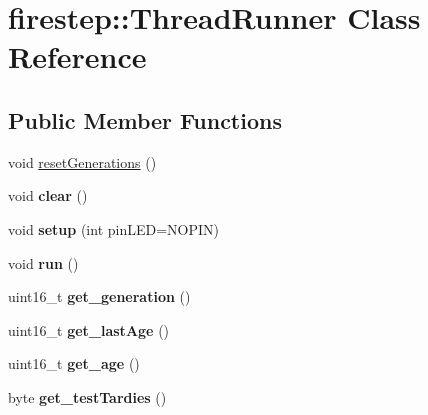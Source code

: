\hypertarget{classfirestep_1_1_thread_runner}{\section{firestep\+:\+:Thread\+Runner Class Reference}
\label{classfirestep_1_1_thread_runner}
}
\subsection*{Public Member Functions}
\begin{DoxyCompactItemize}
\item 
void \hyperlink{classfirestep_1_1_thread_runner_a5d0618373b9fb949f04ae923af314842}{reset\+Generations} ()
\item 
\hypertarget{classfirestep_1_1_thread_runner_a98c086925b952cff676e6709410ab7c5}{void {\bfseries clear} ()}\label{classfirestep_1_1_thread_runner_a98c086925b952cff676e6709410ab7c5}

\item 
\hypertarget{classfirestep_1_1_thread_runner_a510ecff046fe75f5e59a8785e627fc78}{void {\bfseries setup} (int pin\+L\+E\+D=N\+O\+P\+I\+N)}\label{classfirestep_1_1_thread_runner_a510ecff046fe75f5e59a8785e627fc78}

\item 
\hypertarget{classfirestep_1_1_thread_runner_a8a04d5dcf14c421898c15d4131dfd76c}{void {\bfseries run} ()}\label{classfirestep_1_1_thread_runner_a8a04d5dcf14c421898c15d4131dfd76c}

\item 
\hypertarget{classfirestep_1_1_thread_runner_ae4da2c930a006078a3450015083c937f}{uint16\+\_\+t {\bfseries get\+\_\+generation} ()}\label{classfirestep_1_1_thread_runner_ae4da2c930a006078a3450015083c937f}

\item 
\hypertarget{classfirestep_1_1_thread_runner_a94b41f44713663aec974d2e0265bf37f}{uint16\+\_\+t {\bfseries get\+\_\+last\+Age} ()}\label{classfirestep_1_1_thread_runner_a94b41f44713663aec974d2e0265bf37f}

\item 
\hypertarget{classfirestep_1_1_thread_runner_af6d87e51d9bb2e8c8f41ee5ad1cda433}{uint16\+\_\+t {\bfseries get\+\_\+age} ()}\label{classfirestep_1_1_thread_runner_af6d87e51d9bb2e8c8f41ee5ad1cda433}

\item 
\hypertarget{classfirestep_1_1_thread_runner_acb58f24aac14aebc3cc5142e3a0dbd0a}{byte {\bfseries get\+\_\+test\+Tardies} ()}\label{classfirestep_1_1_thread_runner_acb58f24aac14aebc3cc5142e3a0dbd0a}


\end{DoxyCompactItemize}
